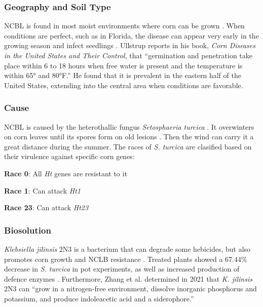 \documentclass[12pt]{article}
\begin{document}
\subsubsection{Geography and Soil Type}

NCBL is found in most moist environments where corn can be grown \autocite{ullstrup1961corn}. When conditions are perfect, such as in Florida, the disease can appear very early in the growing season and infect seedlings \autocite{ullstrup1961corn}. Ullstrup reports in his book, \emph{Corn Diseases in the United States and Their Control}, that ``germination and penetration take place within 6 to 18 hours when free water is present and the temperature is within 65° and 80°F.'' He found that it is prevalent in the eastern half of the United States, extending into the central area when conditions are favorable.

\subsubsection{Cause}

NCBL is caused by the heterothallic fungus \emph{Setosphaeria turcica} \autocite{leonard1989proposed}. It overwinters on corn leaves until its spores form on old lesions \autocite{ullstrup1961corn}. Then the wind can carry it a great distance during the summer. The races of \emph{S. turcica} are clasified based on their virulence against specific corn genes:

\textbf{Race 0}: All \emph{Ht} genes are resistant to it

\textbf{Race 1}: Can attack \emph{Ht1}

\textbf{Race 23}: Can attack \emph{Ht23}

\subsubsection{Biosolution}

\emph{Klebsiella jilinsis} 2N3 is a bacterium that can degrade some hebicides, but also promotes corn growth and NCLB resistance \autocite{zhang2021klebsiella}. Treated plants showed a 67.44\% decrease in \emph{S. turcica} in pot experiments, as well as increased production of defence enzymes \autocite{zhang2021klebsiella}. Furthermore, Zhang et al. determined in 2021 that \emph{K. jilinsis} 2N3 can ``grow in a nitrogen-free environment, dissolve inorganic phosphorus and potassium, and produce indoleacetic acid and a siderophore.''

\newpage


\printbibliography
\end{document}
